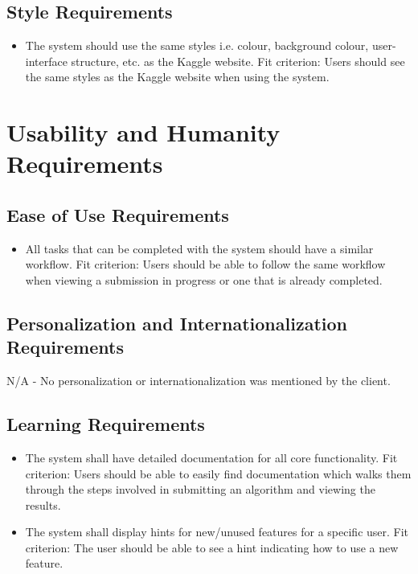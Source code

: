 \documentclass[12pt]{article}
\begin{document}
\subsection{Style Requirements}
\begin{itemize}
    \item The system should use the same styles i.e. colour, background colour, user-interface structure, etc. as the Kaggle website. \hfill \break
    Fit criterion: Users should see the same styles as the Kaggle website when using the system.
\end{itemize}


\section{Usability and Humanity Requirements}
\subsection{Ease of Use Requirements}
\begin{itemize}
    \item All tasks that can be completed with the system should have a similar workflow.\hfill \break
    Fit criterion: Users should be able to follow the same workflow when viewing a submission in progress or one that is already completed.
\end{itemize}
\subsection{Personalization and Internationalization Requirements}
N/A - No personalization or internationalization was mentioned by the client.
\subsection{Learning Requirements}
\begin{itemize}
    \item The system shall have detailed documentation for all core functionality. \hfill \break
    Fit criterion: Users should be able to easily find documentation which walks them through the steps involved in submitting an algorithm and viewing the results.
    \item The system shall display hints for new/unused features for a specific user. \hfill \break
    Fit criterion: The user should be able to see a hint indicating how to use a new feature.
\end{itemize}
\end{document}
